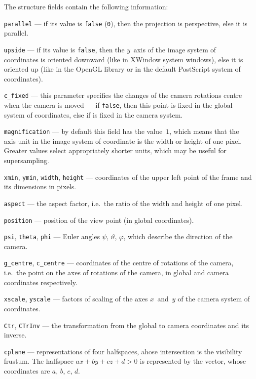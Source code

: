 The structure fields contain the following information:
\begin{mydescription}
  \item[]\texttt{parallel} --- if its value is \texttt{false}
    (\texttt{0}), then the projection is perspective, else it is parallel.
  \item[]\texttt{upside} --- if its value is \texttt{false},
    then the $y$~axis of the image system of coordinates is oriented
    downward (like in XWindow system windows), else it is oriented
    up (like in the OpenGL library or in the default PostScript system
    of coordinates).
  \item[]\texttt{c\_fixed} --- this parameter specifies the changes of the
    camera rotations centre when the camera is moved --- if \texttt{false},
    then this point is fixed in the global system of coordinates, else
    if is fixed in the camera system.
  \item[]\texttt{magnification} --- by default this field has the value~$1$,
    which means that the axis unit in the image system of coordinate is the
    width or height of one pixel. Greater values select appropriately
    shorter units, which may be useful for supersampling.
  \item[]\texttt{xmin}, \texttt{ymin}, \texttt{width}, \texttt{height} ---
    coordinates of the upper left point of the frame and its dimensions in
    pixels.
  \item[]\texttt{aspect} --- the aspect factor, i.e.\ the ratio of the width
    and height of one pixel.
  \item[]\texttt{position} --- position of the view point (in global
    coordinates).
  \item[]\texttt{psi}, \texttt{theta},  \texttt{phi} --- Euler angles
    $\psi$, $\vartheta$, $\varphi$, which describe the direction of the
    camera.
  \item[]\texttt{g\_centre}, \texttt{c\_centre} --- coordinates of the
    centre of rotations of the camera, i.e.\ the point on the axes of
    rotations of the camera, in global and camera coordinates respectively.
  \item[]\texttt{xscale}, \texttt{yscale} --- factors of scaling of the axes
    $x$~and~$y$ of the camera system of coordinates.
  \item[]\texttt{Ctr}, \texttt{CTrInv} --- the transformation from the global
    to camera coordinates and its inverse.
  \item[]\texttt{cplane} --- representations of four halfspaces, ahose
    intersection is the visibility frustum. The halfspace
    $ax+by+cz+d>0$ is represented by the vector, whose coordinates are
    $a$, $b$, $c$, $d$.


\end{mydescription}
